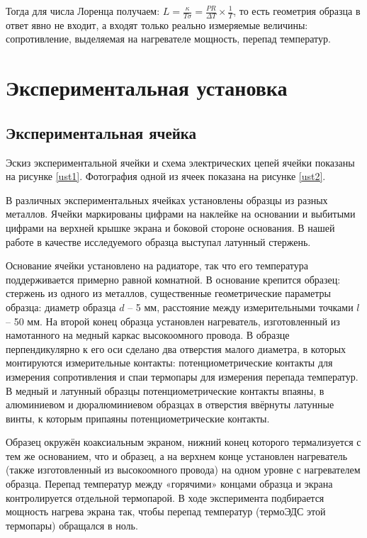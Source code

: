 \documentclass[a4paper,12pt]{article} %
\begin{document}
Тогда для числа Лоренца получаем:
$\displaystyle L=\frac{\kappa}{T\sigma}=\frac{PR}{\Delta T} \times \frac{1}{T}$, то есть геометрия образца в ответ явно не входит, а входят только
реально измеряемые величины: сопротивление, выделяемая на нагревателе мощность, перепад температур.

\section{Экспериментальная установка}

\subsection{Экспериментальная ячейка}

Эскиз экспериментальной ячейки и схема электрических цепей ячейки показаны на рисунке \ref{ust1}. Фотография одной из ячеек показана на рисунке \ref{ust2}.

В различных экспериментальных ячейках установлены образцы из разных металлов. Ячейки маркированы цифрами на наклейке на основании и выбитыми цифрами на верхней крышке экрана и боковой стороне основания. В нашей работе в качестве исследуемого образца выступал латунный стержень.

Основание ячейки установлено на радиаторе, так что его температура поддерживается примерно равной комнатной. В основание крепится образец: стержень из одного из металлов, существенные геометрические параметры образца: диаметр образца $d$ -- 5 мм, расстояние между измерительными точками $l$ -- 50 мм. На второй конец образца установлен нагреватель, изготовленный из намотанного на медный каркас высокоомного провода. В образце перпендикулярно к его оси сделано два отверстия малого диаметра, в которых монтируются измерительные контакты: потенциометрические контакты для измерения сопротивления и спаи термопары для измерения перепада температур. В медный и латунный образцы потенциометрические контакты впаяны, в алюминиевом и дюралюминиевом образцах в отверстия ввёрнуты латунные винты, к которым припаяны потенциометрические контакты.

Образец окружён коаксиальным экраном, нижний конец которого термализуется с тем же основанием, что и образец, а на верхнем конце установлен нагреватель (также изготовленный из высокоомного провода) на одном уровне с нагревателем образца. Перепад температур между «горячими» концами образца и экрана контролируется отдельной термопарой. В ходе эксперимента подбирается мощность нагрева экрана так, чтобы перепад температур (термоЭДС этой термопары) обращался в ноль.
\end{document}
